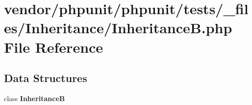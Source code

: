\section{vendor/phpunit/phpunit/tests/\+\_\+files/\+Inheritance/\+Inheritance\+B.php File Reference}
\label{_inheritance_b_8php}
\subsection*{Data Structures}
\begin{DoxyCompactItemize}
\item 
class {\bf Inheritance\+B}
\end{DoxyCompactItemize}
